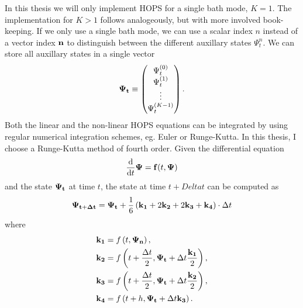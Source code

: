 In this thesis we will only implement HOPS for a single bath mode, $K = 1$. 
The implementation for $K > 1$ follows analogeously, but with more involved book-keeping.
If we only use a single bath mode, we can use a scalar index $n$ instead of a vector index $\vectorbold{n}$ to
distinguish between the different auxillary states $\Psi_t^n$. We can store all auxillary states in
a single vector
\begin{equation*}
    \vb{\Psi_t} \equiv
    \begin{pmatrix}
    \Psi_t^{(0)} \\
    \Psi_t^{(1)} \\
    \vdots \\
    \Psi_t^{(K-1)} \\
    \end{pmatrix}.
\end{equation*}
Both the linear and the non-linear HOPS equations can be integrated by using regular numerical integration schemes,
eg. Euler or Runge-Kutta. In this thesis, I choose a Runge-Kutta method of fourth order. Given the differential equation
\begin{equation}
    \label{eq:Runge_Kutta}
    \frac{\text{d}}{\text{d}t} \vb{\Psi} = \vb{f}(t, \vb{\Psi})
\end{equation}
and the state $\vb{\Psi_t}$ at time $t$, the state at time $t + Delta t$ can be computed as
\begin{equation*}
    \vb{\Psi_{t+\Delta t}} = \vb{\Psi_t} + \frac{1}{6}\left(\vb{k_1} + 2\vb{k_2} + 2\vb{k_3} + \vb{k_4}\right)\cdot \Delta t
\end{equation*}
where
\begin{equation*}
\begin{split}
    \vb{k_1} & = f\left(t, \vb{\Psi_n}\right), \\
    \vb{k_2} & = f\left(t + \frac{\Delta t}{2}, \vb{\Psi_t} + \Delta t\frac{\vb{k_1}}{2}\right), \\
    \vb{k_3} & = f\left(t + \frac{\Delta t}{2}, \vb{\Psi_t} + \Delta t\frac{\vb{k_2}}{2}\right), \\
    \vb{k_4} & = f\left(t + h, \vb{\Psi_t} + \Delta t\vb{k_3}\right).
\end{split}
\end{equation*}

